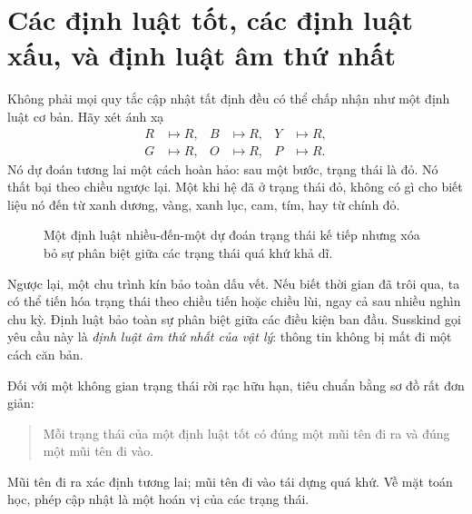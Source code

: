 \section{Các định luật tốt, các định luật xấu, và định luật âm thứ nhất}

Không phải mọi quy tắc cập nhật tất định đều có thể chấp nhận như một định luật cơ bản. Hãy xét ánh xạ
\begin{equation}
 \begin{aligned}
 R&\mapsto R,& B&\mapsto R,& Y&\mapsto R,\\
 G&\mapsto R,& O&\mapsto R,& P&\mapsto R.
 \end{aligned}
 \label{eq:sm1-all-to-red}
\end{equation}
Nó dự đoán tương lai một cách hoàn hảo: sau một bước, trạng thái là đỏ. Nó thất bại theo chiều ngược lại. Một khi hệ đã ở trạng thái đỏ, không có gì cho biết liệu nó đến từ xanh dương, vàng, xanh lục, cam, tím, hay từ chính đỏ.

\begin{figure}[htbp]
\centering
{}
\caption{Một định luật nhiều-đến-một dự đoán trạng thái kế tiếp nhưng xóa bỏ sự phân biệt giữa các trạng thái quá khứ khả dĩ.}
\label{fig:sm1-bad-law}
\end{figure}

Ngược lại, một chu trình kín bảo toàn dấu vết. Nếu biết thời gian đã trôi qua, ta có thể tiến hóa trạng thái theo chiều tiến hoặc chiều lùi, ngay cả sau nhiều nghìn chu kỳ. Định luật bảo toàn sự phân biệt giữa các điều kiện ban đầu. Susskind gọi yêu cầu này là \emph{định luật âm thứ nhất của vật lý}: thông tin không bị mất đi một cách căn bản.

Đối với một không gian trạng thái rời rạc hữu hạn, tiêu chuẩn bằng sơ đồ rất đơn giản:
\begin{quote}
Mỗi trạng thái của một định luật tốt có đúng một mũi tên đi ra và đúng một mũi tên đi vào.
\end{quote}
Mũi tên đi ra xác định tương lai; mũi tên đi vào tái dựng quá khứ. Về mặt toán học, phép cập nhật là một hoán vị của các trạng thái.

